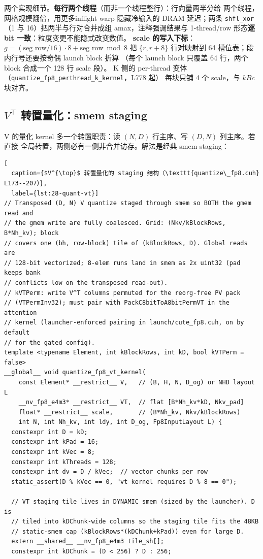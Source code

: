 两个实现细节。\textbf{每行两个线程}（而非一个线程整行）：行向量两半分给
两个线程，网格规模翻倍，用更多inflight warp 隐藏冷输入的 DRAM 延迟；两条
\texttt{shfl\_xor}（1 与 16）把两半与行对合并成组 amax，注释强调结果与
1-thread/row 形态\textbf{逐 bit 一致}：粒度变更不能隐式改变数值。
\textbf{scale 的写入下标}：$g = (\text{seg\_row}/16)\cdot 8 + \text{seg\_row}\bmod 8$
把 $\{r, r+8\}$ 行对映射到 64 槽位表；段内行号还要按奇偶 launch block 折算
（每个 launch block 只覆盖 64 行，两个 block 合成一个 128 行 scale 段）。
K 侧的 per-thread 变体（\texttt{quantize\_fp8\_perthread\_k\_kernel}，L778 起）
每块只铺 4 个 scale，与 $kBc$ 块对齐。

\subsection{$V^{\top}$ 转置量化：smem staging}\label{sec:28-quant-vt}

V 的量化 kernel 多一个转置职责：读 $(N,D)$ 行主序、写 $(D,N)$ 列主序。若直接
全局转置，两侧必有一侧非合并访存。解法是经典 smem staging：

\begin{lstlisting}[
  caption={$V^{\top}$ 转置量化的 staging 结构（\texttt{quantize\_fp8.cuh} L173--207）},
  label={lst:28-quant-vt}]
// Transposed (D, N) V quantize staged through smem so BOTH the gmem read and
// the gmem write are fully coalesced. Grid: (Nkv/kBlockRows, B*Nh_kv); block
// covers one (bh, row-block) tile of (kBlockRows, D). Global reads are
// 128-bit vectorized; 8-elem runs land in smem as 2x uint32 (pad keeps bank
// conflicts low on the transposed read-out).
// kVTPerm: write V^T columns permuted for the reorg-free PV pack
// (VTPermInv32); must pair with PackC8bitToA8bitPermVT in the attention
// kernel (launcher-enforced pairing in launch/cute_fp8.cuh, on by default
// for the gated config).
template <typename Element, int kBlockRows, int kD, bool kVTPerm = false>
__global__ void quantize_fp8_vt_kernel(
    const Element* __restrict__ V,   // (B, H, N, D_og) or NHD layout L
    __nv_fp8_e4m3* __restrict__ VT,  // flat [B*Nh_kv*kD, Nkv_pad]
    float* __restrict__ scale,       // (B*Nh_kv, Nkv/kBlockRows)
    int N, int Nh_kv, int ldy, int D_og, Fp8InputLayout L) {
  constexpr int D = kD;
  constexpr int kPad = 16;
  constexpr int kVec = 8;
  constexpr int kThreads = 128;
  constexpr int dv = D / kVec;  // vector chunks per row
  static_assert(D % kVec == 0, "vt kernel requires D % 8 == 0");

  // VT staging tile lives in DYNAMIC smem (sized by the launcher). D is
  // tiled into kDChunk-wide columns so the staging tile fits the 48KB
  // static-smem cap (kBlockRows*(kDChunk+kPad)) even for large D.
  extern __shared__ __nv_fp8_e4m3 tile_sh[];
  constexpr int kDChunk = (D < 256) ? D : 256;
\end{lstlisting}

